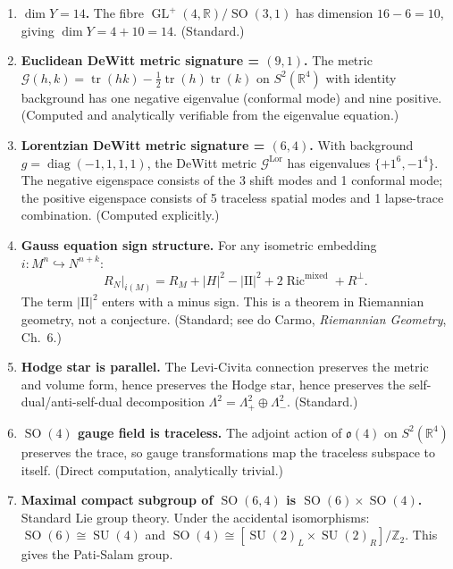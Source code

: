 \documentclass[12pt,a4paper]{article}
\DeclareMathOperator{\tr}{tr}
\DeclareMathOperator{\SO}{SO}
\DeclareMathOperator{\SU}{SU}
\DeclareMathOperator{\GL}{GL}
\DeclareMathOperator{\Ric}{Ric}
\DeclareMathOperator{\diag}{diag}
\begin{document}
\begin{provenbox}

\begin{enumerate}
\item \textbf{$\dim Y = 14$.} The fibre $\GL^+(4,\mathbb{R})/\SO(3,1)$ has dimension $16 - 6 = 10$, giving $\dim Y = 4 + 10 = 14$. (Standard.)

\item \textbf{Euclidean DeWitt metric signature = $(9,1)$.} The metric $\mathcal{G}(h,k) = \tr(hk) - \tfrac{1}{2}\tr(h)\tr(k)$ on $S^2(\mathbb{R}^4)$ with identity background has one negative eigenvalue (conformal mode) and nine positive. (Computed and analytically verifiable from the eigenvalue equation.)

\item \textbf{Lorentzian DeWitt metric signature = $(6,4)$.} With background $g = \diag(-1,1,1,1)$, the DeWitt metric $\mathcal{G}^{\text{Lor}}$ has eigenvalues $\{+1^6, -1^4\}$. The negative eigenspace consists of the 3 shift modes and 1 conformal mode; the positive eigenspace consists of 5 traceless spatial modes and 1 lapse-trace combination. (Computed explicitly.)

\item \textbf{Gauss equation sign structure.} For any isometric embedding $i: M^n \hookrightarrow N^{n+k}$:
\begin{equation}
R_N\big|_{i(M)} = R_M + |H|^2 - |\mathrm{II}|^2 + 2\Ric^{\text{mixed}} + R^\perp.
\end{equation}
The term $|\mathrm{II}|^2$ enters with a minus sign. This is a theorem in Riemannian geometry, not a conjecture. (Standard; see do Carmo, \textit{Riemannian Geometry}, Ch.~6.)

\item \textbf{Hodge star is parallel.} The Levi-Civita connection preserves the metric and volume form, hence preserves the Hodge star, hence preserves the self-dual/anti-self-dual decomposition $\Lambda^2 = \Lambda^2_+ \oplus \Lambda^2_-$. (Standard.)

\item \textbf{$\SO(4)$ gauge field is traceless.} The adjoint action of $\mathfrak{o}(4)$ on $S^2(\mathbb{R}^4)$ preserves the trace, so gauge transformations map the traceless subspace to itself. (Direct computation, analytically trivial.)

\item \textbf{Maximal compact subgroup of $\SO(6,4)$ is $\SO(6)\times\SO(4)$.} Standard Lie group theory. Under the accidental isomorphisms: $\SO(6) \cong \SU(4)$ and $\SO(4) \cong [\SU(2)_L \times \SU(2)_R]/\mathbb{Z}_2$. This gives the Pati-Salam group.
\end{enumerate}
\end{provenbox}
\end{document}
